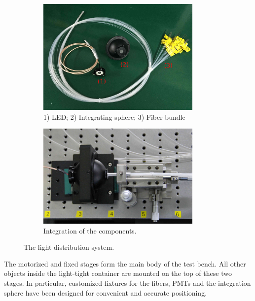 \documentclass{nst}
\begin{document}
\begin{figure}[!htb]
	
	\begin{subfigure}[t]{80mm}
		\includegraphics[width=80mm]{FIG3_a.jpg}
		\caption{1) LED; 2) Integrating sphere; 3) Fiber bundle}
		\label{fig:FIG3_a}
	\end{subfigure}
	\begin{subfigure}[t]{80mm}
		\includegraphics[width=80mm]{FIG3_b.jpg}
		\caption{Integration of the components.}
		\label{fig:FIG3_b}
	\end{subfigure}
	
	\caption{The light distribution system.}
	\label{fig:FIG3}
\end{figure}

The motorized and fixed stages form the main body of the test bench.
All other objects inside the light-tight container are mounted on the top of these two stages.
In particular, customized fixtures for the fibers, PMTs and the integration sphere have been designed for convenient and accurate positioning.

\end{document}
